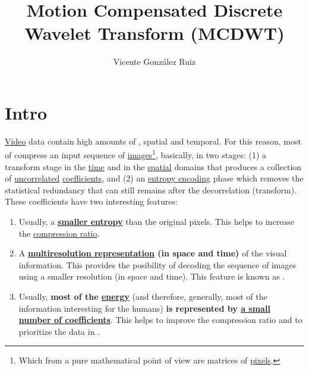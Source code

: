 \title{Motion Compensated Discrete Wavelet Transform (MCDWT)}
\author{Vicente González Ruiz}
\maketitle
\tableofcontents

\section{Intro}

\href{https://en.wikipedia.org/wiki/Video}{Video} data contain high
amounts of , spatial and temporal. For
this reason, most of 
compress an input sequence of
\href{https://en.wikipedia.org/wiki/Digital_image}{images}\footnote{Which
  from a pure mathematical point of view are matrices of
  \href{https://en.wikipedia.org/wiki/Pixel}{pixels}.}, basically, in
two stages: (1) a transform stage in the
\href{https://en.wikipedia.org/wiki/Time_domain}{time} and in the
\href{https://www.quora.com/What-is-spatial-domain-in-image-processing}{spatial}
domains that produces a collection of
\href{https://en.wikipedia.org/wiki/Decorrelation}{uncorrelated}
\href{https://en.wikipedia.org/wiki/Discrete_wavelet_transform}{coefficients}, and (2) an
\href{https://en.wikipedia.org/wiki/Entropy_encoding}{entropy
  encoding} phase which removes the statistical redundancy that can
still remains after the decorrelation (transform). These coefficients
have two interesting features:
\begin{enumerate}
\item Usually, a \textbf{
  \href{https://vicente-gonzalez-ruiz.github.io/symbol_compression/}{smaller
  entropy}} than the original pixels. This helps to increase
  the \href{https://en.wikipedia.org/wiki/Data_compression_ratio}{compression
    ratio}.
\item A
  \textbf{\href{https://en.wikipedia.org/wiki/Image_resolution}{multiresolution
      representation} (in space and time)} of the visual
  information. This provides the posibility of decoding the sequence
  of images using a smaller resolution (in space and time). This
  feature is known as .
\item Usually, \textbf{most of the
  \href{https://en.wikipedia.org/wiki/Energy_(signal_processing)}{energy}}
  (and therefore, generally, most of the information interesting for
  the humans) \textbf{is represented by
    \href{https://vicente-gonzalez-ruiz.github.io/image_transformations_for_coding}{a
      small number of coefficients}}. This helps to improve the
  compression ratio and to prioritize the data in
  .
\end{enumerate}

